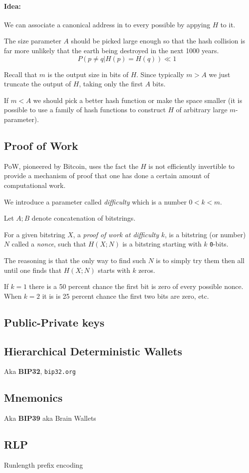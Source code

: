 \paragraph{Idea:}

We can associate a canonical address in  to every possible  by appying $H$ to it.

The size parameter $A$ should be picked large enough so that the hash collision is far more unlikely that the earth being destroyed in the next 1000 years.
\[
P(p \neq q | H(p)=H(q)) \ll 1
\]

Recall that $m$ is the output size in bits of $H$. Since typically $m>A$ we just truncate the output of $H$, taking only the first $A$ bits.

If $m<A$ we should pick a better hash function or make the space smaller (it is possible to use a family of hash functions to construct $H$ of arbitrary large $m$-parameter).


\subsection{Proof of Work}
\label{PoW}

PoW, pioneered by Bitcoin, uses the fact the $H$ is not efficiently invertible to provide a mechanism of proof that one has done a certain amount of computational work.

We introduce a parameter called \emph{difficulty} which is a number $0 < k < m$.

Let $A;B$ denote concatenation of bitstrings.

For a given bitstring $X$, a \emph{proof of work at difficulty $k$},
is a bitstring (or number) $N$ called a \emph{nonce},
such that $H(X;N)$ is a bitstring starting with $k$ \texttt{0}-bits.

The reasoning is that the only way to find such $N$ is to simply try them then all until one finds that $H(X;N)$ starts with $k$ zeros.

If $k=1$ there is a 50 percent chance the first bit is zero of every possible nonce.
When $k=2$ it is is 25 percent chance the first two bits are zero, etc.



\subsection{Public-Private keys}

\subsection{Hierarchical Deterministic Wallets}

Aka \textbf{BIP32}, \texttt{bip32.org}

\subsection{Mnemonics}

Aka \textbf{BIP39} aka Brain Wallets

\subsection{RLP}

Runlength prefix encoding


